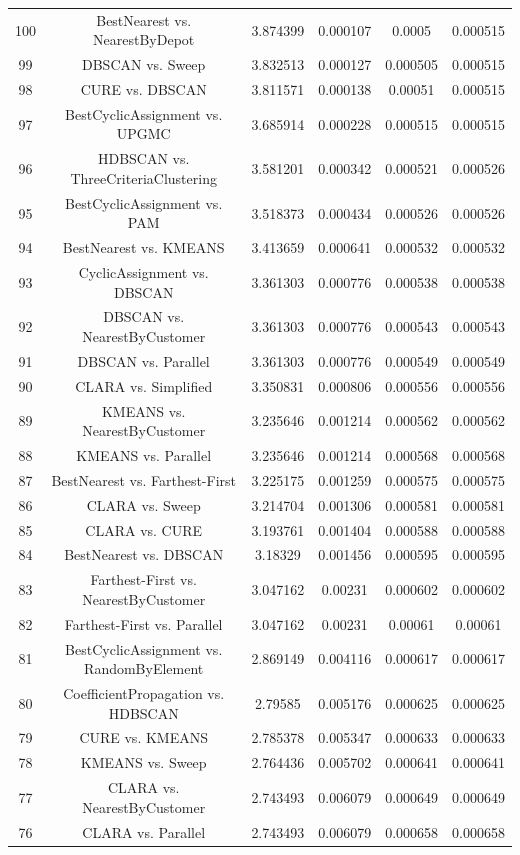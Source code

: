 \documentclass[a4paper,10pt]{article}
\begin{document}
\begin{landscape}
\begin{table}[!htp]
\begin{tabular}{cccccc}
100&BestNearest vs. NearestByDepot&3.874399&0.000107&0.0005&0.000515\\
99&DBSCAN vs. Sweep&3.832513&0.000127&0.000505&0.000515\\
98&CURE vs. DBSCAN&3.811571&0.000138&0.00051&0.000515\\
97&BestCyclicAssignment vs. UPGMC&3.685914&0.000228&0.000515&0.000515\\
96&HDBSCAN vs. ThreeCriteriaClustering&3.581201&0.000342&0.000521&0.000526\\
95&BestCyclicAssignment vs. PAM&3.518373&0.000434&0.000526&0.000526\\
94&BestNearest vs. KMEANS&3.413659&0.000641&0.000532&0.000532\\
93&CyclicAssignment vs. DBSCAN&3.361303&0.000776&0.000538&0.000538\\
92&DBSCAN vs. NearestByCustomer&3.361303&0.000776&0.000543&0.000543\\
91&DBSCAN vs. Parallel&3.361303&0.000776&0.000549&0.000549\\
90&CLARA vs. Simplified&3.350831&0.000806&0.000556&0.000556\\
89&KMEANS vs. NearestByCustomer&3.235646&0.001214&0.000562&0.000562\\
88&KMEANS vs. Parallel&3.235646&0.001214&0.000568&0.000568\\
87&BestNearest vs. Farthest-First&3.225175&0.001259&0.000575&0.000575\\
86&CLARA vs. Sweep&3.214704&0.001306&0.000581&0.000581\\
85&CLARA vs. CURE&3.193761&0.001404&0.000588&0.000588\\
84&BestNearest vs. DBSCAN&3.18329&0.001456&0.000595&0.000595\\
83&Farthest-First vs. NearestByCustomer&3.047162&0.00231&0.000602&0.000602\\
82&Farthest-First vs. Parallel&3.047162&0.00231&0.00061&0.00061\\
81&BestCyclicAssignment vs. RandomByElement&2.869149&0.004116&0.000617&0.000617\\
80&CoefficientPropagation vs. HDBSCAN&2.79585&0.005176&0.000625&0.000625\\
79&CURE vs. KMEANS&2.785378&0.005347&0.000633&0.000633\\
78&KMEANS vs. Sweep&2.764436&0.005702&0.000641&0.000641\\
77&CLARA vs. NearestByCustomer&2.743493&0.006079&0.000649&0.000649\\
76&CLARA vs. Parallel&2.743493&0.006079&0.000658&0.000658\\

\end{tabular}
\end{table}
\end{landscape}
\end{document}
